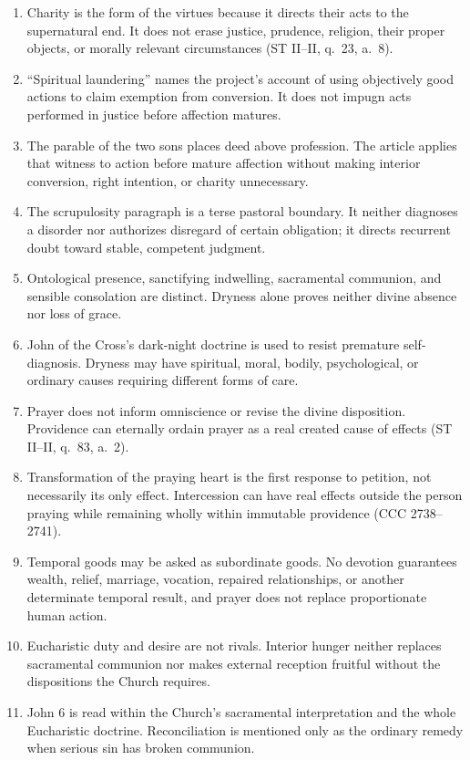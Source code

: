\begin{enumerate}[leftmargin=1.45em,itemsep=0.25em]
\item Charity is the form of the virtues because it directs their acts to the supernatural end. It does not erase justice, prudence, religion, their proper objects, or morally relevant circumstances (ST II--II, q.~23, a.~8).
\item ``Spiritual laundering'' names the project's account of using objectively good actions to claim exemption from conversion. It does not impugn acts performed in justice before affection matures.
\item The parable of the two sons places deed above profession. The article applies that witness to action before mature affection without making interior conversion, right intention, or charity unnecessary.
\item The scrupulosity paragraph is a terse pastoral boundary. It neither diagnoses a disorder nor authorizes disregard of certain obligation; it directs recurrent doubt toward stable, competent judgment.
\item Ontological presence, sanctifying indwelling, sacramental communion, and sensible consolation are distinct. Dryness alone proves neither divine absence nor loss of grace.
\item John of the Cross's dark-night doctrine is used to resist premature self-diagnosis. Dryness may have spiritual, moral, bodily, psychological, or ordinary causes requiring different forms of care.
\item Prayer does not inform omniscience or revise the divine disposition. Providence can eternally ordain prayer as a real created cause of effects (ST II--II, q.~83, a.~2).
\item Transformation of the praying heart is the first response to petition, not necessarily its only effect. Intercession can have real effects outside the person praying while remaining wholly within immutable providence (CCC 2738--2741).
\item Temporal goods may be asked as subordinate goods. No devotion guarantees wealth, relief, marriage, vocation, repaired relationships, or another determinate temporal result, and prayer does not replace proportionate human action.
\item Eucharistic duty and desire are not rivals. Interior hunger neither replaces sacramental communion nor makes external reception fruitful without the dispositions the Church requires.
\item John 6 is read within the Church's sacramental interpretation and the whole Eucharistic doctrine. Reconciliation is mentioned only as the ordinary remedy when serious sin has broken communion.

\end{enumerate}
